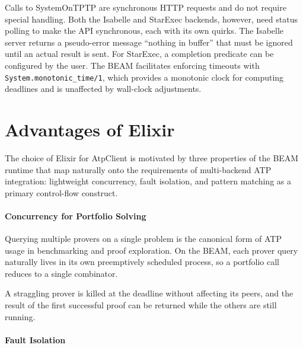 \documentclass[]{ceurart}
\begin{document}
Calls to SystemOnTPTP are synchronous HTTP requests and do not require special handling. Both the Isabelle and StarExec backends, however, need status polling to make the API synchronous, each with its own quirks. The Isabelle server returns a pseudo-error message ``nothing in buffer'' that must be ignored until an actual result is sent. For StarExec, a completion predicate can be configured by the user. The BEAM facilitates enforcing timeouts with \texttt{System.monotonic_time/1}, which provides a monotonic clock for computing deadlines and is unaffected by wall-clock adjustments.

\section{Advantages of Elixir}\label{sec:4}

The choice of Elixir for AtpClient is motivated by three properties of the BEAM runtime that map naturally onto the requirements of multi-backend ATP integration: lightweight concurrency, fault isolation, and pattern matching as a primary control-flow construct.

\paragraph{Concurrency for Portfolio Solving}

Querying multiple provers on a single problem is the canonical form of ATP usage in benchmarking and proof exploration. On the BEAM, each prover query naturally lives in its own preemptively scheduled process, so a portfolio call reduces to a single combinator.


\noindent A straggling prover is killed at the deadline without affecting its peers, and the result of the first successful proof can be returned while the others are still running.

\paragraph{Fault Isolation}
\end{document}
